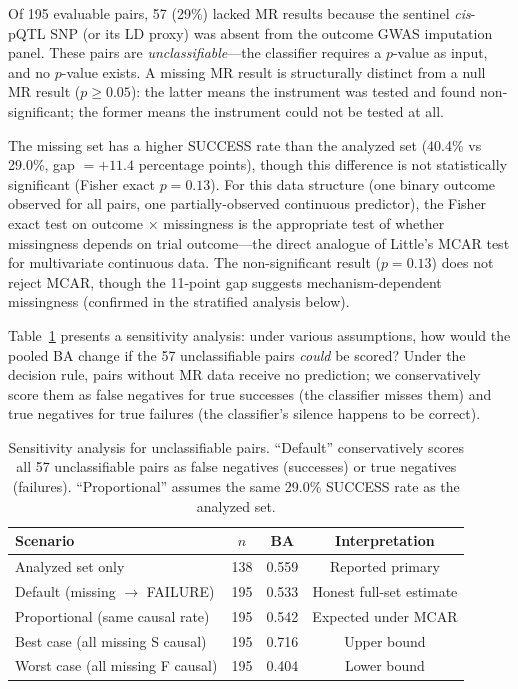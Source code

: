 \documentclass[11pt]{article}
\begin{document}
Of 195 evaluable pairs, 57 (29\%) lacked MR results because the sentinel \emph{cis}-pQTL SNP (or its LD proxy) was absent from the outcome GWAS imputation panel. These pairs are \emph{unclassifiable}---the classifier requires a $p$-value as input, and no $p$-value exists. A missing MR result is structurally distinct from a null MR result ($p \geq 0.05$): the latter means the instrument was tested and found non-significant; the former means the instrument could not be tested at all.

The missing set has a higher SUCCESS rate than the analyzed set (40.4\% vs 29.0\%, gap $= +11.4$ percentage points), though this difference is not statistically significant (Fisher exact $p = 0.13$). For this data structure (one binary outcome observed for all pairs, one partially-observed continuous predictor), the Fisher exact test on outcome $\times$ missingness is the appropriate test of whether missingness depends on trial outcome---the direct analogue of Little's MCAR test for multivariate continuous data. The non-significant result ($p = 0.13$) does not reject MCAR, though the 11-point gap suggests mechanism-dependent missingness (confirmed in the stratified analysis below).

Table~\ref{tab:bounds} presents a sensitivity analysis: under various assumptions, how would the pooled BA change if the 57 unclassifiable pairs \emph{could} be scored? Under the decision rule, pairs without MR data receive no prediction; we conservatively score them as false negatives for true successes (the classifier misses them) and true negatives for true failures (the classifier's silence happens to be correct).

\vspace{1em}
\begin{table}[t]
\centering
\caption{Sensitivity analysis for unclassifiable pairs. ``Default'' conservatively scores all 57 unclassifiable pairs as false negatives (successes) or true negatives (failures). ``Proportional'' assumes the same 29.0\% SUCCESS rate as the analyzed set.}
\label{tab:bounds}
\begin{tabular}{lccc}
\toprule
Scenario & $n$ & BA & Interpretation \\
\midrule
Analyzed set only & 138 & 0.559 & Reported primary \\
Default (missing $\rightarrow$ FAILURE) & 195 & 0.533 & Honest full-set estimate \\
Proportional (same causal rate) & 195 & 0.542 & Expected under MCAR \\
Best case (all missing S causal) & 195 & 0.716 & Upper bound \\
Worst case (all missing F causal) & 195 & 0.404 & Lower bound \\
\bottomrule
\end{tabular}
\end{table}
\end{document}
